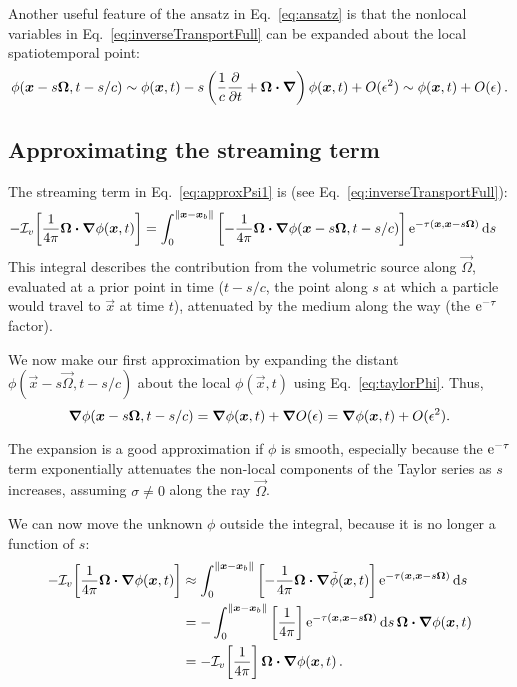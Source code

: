 Another useful feature of the ansatz in Eq.~\eqref{eq:ansatz} is that the
nonlocal variables in Eq.~\eqref{eq:inverseTransportFull} can be expanded about
the local spatiotemporal point:
\begin{equation} \label{eq:taylorPhi}
  \phi(\bm{x} - s \bm{\Omega}, t-s/c)
  \sim \phi(\bm{x},t) - s \left( \frac{1}{c} \frac{\partial }{\partial t} + \bm{\Omega} \bm{\cdot}
  \bm{\nabla}  \right) \phi (\bm{x}, t) + O(\epsilon^2) \sim \phi(\bm{x},t) +
  O(\epsilon) \,.
\end{equation}

\subsection{Approximating the streaming term}
The streaming term in Eq.~\eqref{eq:approxPsi1} is (see
Eq.~\eqref{eq:inverseTransportFull}):
\begin{align*}
- \mathcal{I}_{v}\!\left[\frac{1}{4\pi} \bm{\Omega}\bm{\cdot} \bm{\nabla} \phi(\bm{x}, t)\right]
  &= \int_{0}^{\left\| \bm{x} - \bm{x}_b \right\|}
    \left[ -\frac1{4\pi}\bm{\Omega}\bm{\cdot} \bm{\nabla} \phi(\bm{x} - s \bm{\Omega},
    t-s/c)
    \right]
    \mathop{}\!\mathrm{e}^{ -\tau(\bm{x}, \bm{x} - s \bm{\Omega})}
    \mathop{}\!\mathrm{d} s
\end{align*}
This integral describes the contribution from the volumetric source  along
$\vec{\Omega}$, evaluated at a prior
point in time ($t-s/c$, the point along $s$ at which a particle would travel
to $\vec{x}$ at time $t$), attenuated by the medium along the way (the
$\mathop{}\!\mathrm{e}^{ -\tau }$ factor).

We now make our first approximation by expanding the distant $\phi(\vec{x} - s
\vec{\Omega}, t-s/c)$ about the local $\phi(\vec{x}, t)$ using
Eq.~\eqref{eq:taylorPhi}. Thus,
\begin{equation*}
  \bm{\nabla} \phi(\bm{x} - s \bm{\Omega}, t-s/c)
  = \bm{\nabla} \phi(\bm{x}, t) + \bm{\nabla} O(\epsilon)
  = \bm{\nabla} \phi(\bm{x}, t) + O(\epsilon^2).
\end{equation*}

The expansion is a good approximation if $\phi$ is smooth, especially because the
$\mathop{}\!\mathrm{e}^{ -\tau }$ term exponentially attenuates the non-local components of the
Taylor series as $s$ increases, assuming $\sigma\ne 0$ along the ray
$\vec{\Omega}$.

We can now move the unknown $\phi$ outside the integral,
because it is no longer a function of $s$:
\begin{align}\nonumber
- \mathcal{I}_{v}\!\left[\frac{1}{4\pi} \bm{\Omega}\bm{\cdot} \bm{\nabla} \phi(\bm{x}, t)\right]
  &\approx \int_{0}^{\left\| \bm{x} - \bm{x}_b \right\|}
    \left[ -\frac1{4\pi}\bm{\Omega}\bm{\cdot} \bm{\nabla} \tilde\phi(\bm{x},t) \right]
    \mathop{}\!\mathrm{e}^{ -\tau(\bm{x}, \bm{x} - s \bm{\Omega})}
    \mathop{}\!\mathrm{d} s
  \\\nonumber
  &= - \int_{0}^{\left\| \bm{x} - \bm{x}_b \right\|}
    \left[ \frac1{4\pi}\right]
    \mathop{}\!\mathrm{e}^{ -\tau(\bm{x}, \bm{x} - s \bm{\Omega})} \mathop{}\!\mathrm{d} s \,
    \bm{\Omega}\bm{\cdot} \bm{\nabla} \phi(\bm{x},t)
  \\\label{eq:streamingApprox}
  &= - \mathcal{I}_{v}\!\left[ \frac1{4\pi} \right] \bm{\Omega}\bm{\cdot} \bm{\nabla} \phi(\bm{x},t)
  \,.
\end{align}

